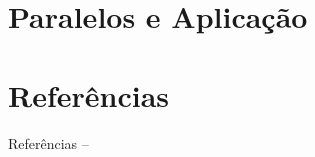 \documentclass[12pt,aspectratio=169]{beamer}
\begin{document}
\section{Paralelos e Aplicação}

\section{Referências}

    \begin{frame}[allowframebreaks]{Referências -- }
        
        
    \end{frame}

\end{document}
